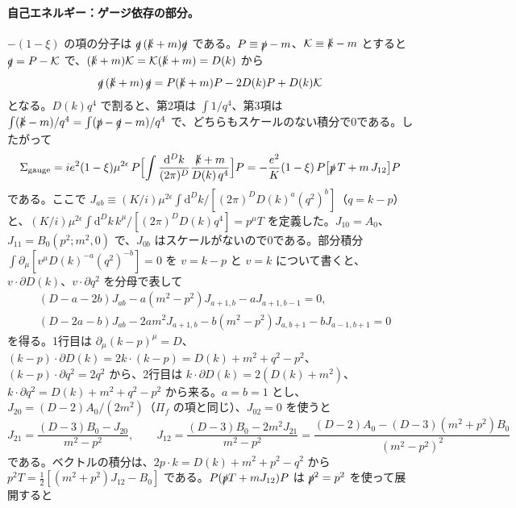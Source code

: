 \documentclass[a4paper,10pt]{ltjsarticle}
\newcommand{\dd}{\mathrm{d}}
\begin{document}
\paragraph{自己エネルギー：ゲージ依存の部分。}$-(1-\xi)$ の項の分子は $\slashed q\,(\slashed k+m)\slashed q$ である。$P\equiv\slashed p-m$、$\mathcal K\equiv\slashed k-m$ とすると $\slashed q=P-\mathcal K$ で、$(\slashed k+m)\mathcal K=\mathcal K(\slashed k+m)=D(k)$ から
\begin{equation*}
\slashed q\,(\slashed k+m)\,\slashed q=P(\slashed k+m)P-2D(k)P+D(k)\mathcal K
\end{equation*}
となる。$D(k)q^4$ で割ると、第2項は $\int1/q^4$、第3項は $\int(\slashed k-m)/q^4=\int(\slashed p-\slashed q-m)/q^4$ で、どちらもスケールのない積分で0である。したがって
\begin{equation*}
\Sigma_{\mathrm{gauge}}=ie^2(1-\xi)\mu^{2\epsilon}\,P\Bigl[\int\frac{\dd^Dk}{(2\pi)^D}\frac{\slashed k+m}{D(k)\,q^4}\Bigr]P
=-\frac{e^2}{K}(1-\xi)\,P\bigl[\slashed p\,T+m\,J_{12}\bigr]P
\end{equation*}
である。ここで $J_{ab}\equiv(K/i)\mu^{2\epsilon}\int\dd^Dk/[(2\pi)^DD(k)^a(q^2)^b]$（$q=k-p$）と、$(K/i)\mu^{2\epsilon}\int\dd^Dk\,k^\mu/[(2\pi)^DD(k)q^4]=p^\mu T$ を定義した。$J_{10}=A_0$、$J_{11}=B_0(p^2;m^2,0)$ で、$J_{0b}$ はスケールがないので0である。部分積分 $\int\partial_\mu[v^\mu D(k)^{-a}(q^2)^{-b}]=0$ を $v=k-p$ と $v=k$ について書くと、$v\cdot\partial D(k)$、$v\cdot\partial q^2$ を分母で表して
\begin{equation*}
\begin{aligned}
&(D-a-2b)J_{ab}-a(m^2-p^2)J_{a+1,b}-aJ_{a+1,b-1}=0,\\
&(D-2a-b)J_{ab}-2am^2J_{a+1,b}-b(m^2-p^2)J_{a,b+1}-bJ_{a-1,b+1}=0
\end{aligned}
\end{equation*}
を得る。1行目は $\partial_\mu(k-p)^\mu=D$、$(k-p)\cdot\partial D(k)=2k\cdot(k-p)=D(k)+m^2+q^2-p^2$、$(k-p)\cdot\partial q^2=2q^2$ から、2行目は $k\cdot\partial D(k)=2(D(k)+m^2)$、$k\cdot\partial q^2=D(k)+m^2+q^2-p^2$ から来る。$a=b=1$ とし、$J_{20}=(D-2)A_0/(2m^2)$（$\Pi_f$ の項と同じ）、$J_{02}=0$ を使うと
\begin{equation*}
J_{21}=\frac{(D-3)B_0-J_{20}}{m^2-p^2},\qquad
J_{12}=\frac{(D-3)B_0-2m^2J_{21}}{m^2-p^2}=\frac{(D-2)A_0-(D-3)(m^2+p^2)B_0}{(m^2-p^2)^2}
\end{equation*}
である。ベクトルの積分は、$2p\cdot k=D(k)+m^2+p^2-q^2$ から $p^2T=\frac12[(m^2+p^2)J_{12}-B_0]$ である。$P(\slashed pT+mJ_{12})P$ は $\slashed p^2=p^2$ を使って展開すると
\end{document}
